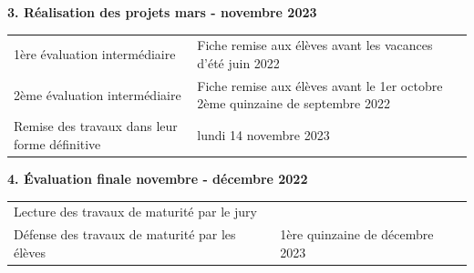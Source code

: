 \documentclass[
  10pt,
  french,
  a5paper,
  openany]{book}
\begin{document}

\clearpage


\textbf{3. Réalisation des projets \hfill mars - novembre 2023}

\begin{longtable}[]{@{}ll@{}}
\toprule
\endhead
\begin{minipage}[t]{0.35\columnwidth}\raggedright
1ère évaluation intermédiaire\strut
\end{minipage} & \begin{minipage}[t]{0.59\columnwidth}\raggedright
Fiche remise aux élèves avant les vacances d'été juin 2022\strut
\end{minipage}\tabularnewline
\begin{minipage}[t]{0.35\columnwidth}\raggedright
2ème évaluation intermédiaire\strut
\end{minipage} & \begin{minipage}[t]{0.59\columnwidth}\raggedright
Fiche remise aux élèves avant le 1er octobre 2ème quinzaine de septembre 2022\strut
\end{minipage}\tabularnewline
\begin{minipage}[t]{0.35\columnwidth}\raggedright
Remise des travaux dans leur forme définitive\strut
\end{minipage} & \begin{minipage}[t]{0.59\columnwidth}\raggedright
lundi 14 novembre 2023\strut
\end{minipage}\tabularnewline
\bottomrule
\end{longtable}


\textbf{4. Évaluation finale \hfill novembre - décembre 2022}

\begin{longtable}[]{@{}ll@{}}
\toprule
\endhead
\begin{minipage}[t]{0.56\columnwidth}\raggedright
Lecture des travaux de maturité par le jury\strut
\end{minipage} & \begin{minipage}[t]{0.38\columnwidth}\raggedright
\strut
\end{minipage}\tabularnewline
\begin{minipage}[t]{0.56\columnwidth}\raggedright
Défense des travaux de maturité par les élèves\strut
\end{minipage} & \begin{minipage}[t]{0.38\columnwidth}\raggedright
1ère quinzaine de décembre 2023\strut
\end{minipage}\tabularnewline
\bottomrule
\end{longtable}
\end{document}

